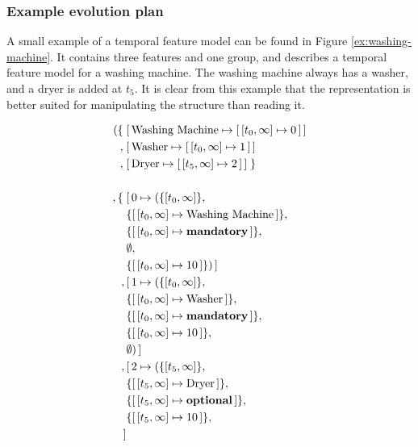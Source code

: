 \subsubsection{Example evolution plan}
A small example of a temporal feature model can be found in Figure \vref{ex:washing-machine}. It contains three features and one group, and describes a temporal feature model for a washing machine. The washing machine always has a washer, and a dryer is added at $t_5$. It is clear from this example that the representation is better suited for manipulating the structure than reading it. 

\begin{figure}
  \begin{align*}
    ( \{ \; & \mapping{\text{Washing Machine}}{\intervalmapping{t_0}{\forever}{0}} \\
       ,\; & \mapping{\text{Washer}}{\intervalmapping{t_0}{\forever}{1}} \\
       ,\; & \mapping{\text{Dryer}}{\intervalmapping{t_5}{\forever}{2}}\; \} \\
       \\
       ,\{\; & \mapping{0}{(\{ \interval{t_0}{\forever}\} ,\, \\
             & \{\intervalmapping{t_0}{\forever}{\text{Washing Machine}}\} ,\, \\
             & \{\intervalmapping{t_0}{\forever}{\textbf{mandatory}}\} ,\, \\
             &  \emptyset ,\, \\ 
             & \{\intervalmapping{t_0}{\forever}{10}\} ) } \\
             ,\, & \mapping{1}{(\{\interval{t_0}{\forever}\} ,\, \\
             & \{\intervalmapping{t_0}{\forever}{\text{Washer}}\} ,\, \\
             & \{\intervalmapping{t_0}{\forever}{\textbf{mandatory}}\} ,\, \\
             &  \{\intervalmapping{t_0}{\forever}{10}\} ,\, \\ 
             & \emptyset)} \\
             ,\, & \mapping{2}{(\{\interval{t_5}{\forever}\} ,\, \\
             & \{\intervalmapping{t_5}{\forever}{\text{Dryer}}\} ,\, \\
             & \{\intervalmapping{t_5}{\forever}{\textbf{optional}}\} ,\, \\
             &  \{\intervalmapping{t_5}{\forever}{10}\} ,\, \\ 
}
\end{align*}
\end{figure}
